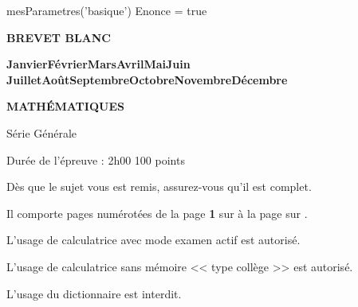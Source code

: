 \documentclass{classe-tex3R}
\newcommand{\monthyear}{\ifcase\month\or
  Janvier\or Février\or Mars\or Avril\or Mai\or Juin\or
  Juillet\or Août\or Septembre\or Octobre\or Novembre\or Décembre\fi
  \space\number\year
}
\begin{document}
\begin{luacode}
  mesParametres('basique')
  Enonce = true
\end{luacode}
\parametrage


\lfoot{\thepage/\pageref{LastPage}}


 \begin{center}
    \bfseries BREVET BLANC
    
    \bfseries \monthyear
    
    \sautligne
    
  \end{center}
  
  \begin{tcolorbox}[
    colframe = black, 
    colback=black!0,
    coltitle=white,
    sharp corners,
    valign=center,
    top=2cm,
    bottom=0.5cm,
    left=0.5cm,
    enhanced,
    before skip=0cm,
  ]
  \begin{center}
    \textbf{ MATHÉMATIQUES}
    
    Série Générale
    
    \sautligne
    
    
    Durée de l'épreuve : 2h00 \hfill 100 points
  \end{center}
  \end{tcolorbox}
  
  \vfill
  
  \begin{center}
    Dès que le sujet vous est remis, assurez-vous qu’il est complet.
  
    \sautligne
  
    Il comporte \textbf{\pageref{LastPage}} pages numérotées de la page \textbf{1} sur \textbf{\pageref{LastPage}} à la page \textbf{\pageref{LastPage}} sur \textbf{\pageref{LastPage}}.
  \end{center}
  
  \sautligne
  
  \begin{center}
    L'usage de calculatrice avec mode examen actif est autorisé.
  
    \sautligne
    
    L'usage de calculatrice sans mémoire << type collège >> est autorisé.
    
    \sautligne
  
    L'usage du dictionnaire est interdit.
  \end{center}
\end{document}
